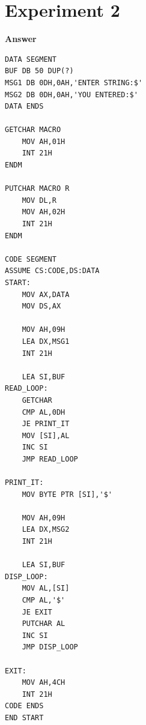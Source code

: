\documentclass[11pt,a4paper]{article}
\begin{document}
\section*{Experiment 2}
\noindent{}
\vspace{0.4em}
\noindent\textbf{Answer}
\begin{lstlisting}[style=asmbase]
DATA SEGMENT
BUF DB 50 DUP(?)
MSG1 DB 0DH,0AH,'ENTER STRING:$'
MSG2 DB 0DH,0AH,'YOU ENTERED:$'
DATA ENDS

GETCHAR MACRO
    MOV AH,01H
    INT 21H
ENDM

PUTCHAR MACRO R
    MOV DL,R
    MOV AH,02H
    INT 21H
ENDM

CODE SEGMENT
ASSUME CS:CODE,DS:DATA
START:
    MOV AX,DATA
    MOV DS,AX

    MOV AH,09H
    LEA DX,MSG1
    INT 21H

    LEA SI,BUF
READ_LOOP:
    GETCHAR
    CMP AL,0DH
    JE PRINT_IT
    MOV [SI],AL
    INC SI
    JMP READ_LOOP

PRINT_IT:
    MOV BYTE PTR [SI],'$'

    MOV AH,09H
    LEA DX,MSG2
    INT 21H

    LEA SI,BUF
DISP_LOOP:
    MOV AL,[SI]
    CMP AL,'$'
    JE EXIT
    PUTCHAR AL
    INC SI
    JMP DISP_LOOP

EXIT:
    MOV AH,4CH
    INT 21H
CODE ENDS
END START
\end{lstlisting}
\end{document}
